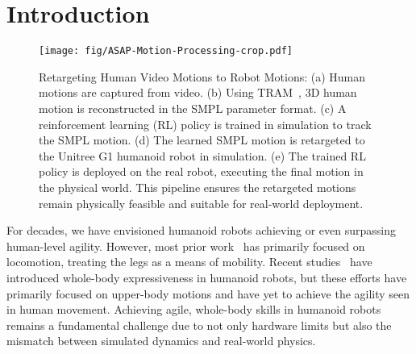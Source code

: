 

\section{Introduction}
\label{sec:introduction}


\begin{figure*}[t]
    \centering
    \texttt{[image: fig/ASAP-Motion-Processing-crop.pdf]}
    \vspace{-3mm}
    \caption{Retargeting Human Video Motions to Robot Motions: (a) Human motions are captured from video. (b) Using TRAM~\cite{wang2025tram}, 3D human motion is reconstructed in the SMPL parameter format. (c) A reinforcement learning (RL) policy is trained in simulation to track the SMPL motion. (d) The learned SMPL motion is retargeted to the Unitree G1 humanoid robot in simulation. (e) The trained RL policy is deployed on the real robot, executing the final motion in the physical world. This pipeline ensures the retargeted motions remain physically feasible and suitable for real-world deployment.}
    \vspace{-3mm}
    \label{fig:data_processing}
\end{figure*}

For decades, we have envisioned humanoid robots achieving or even surpassing human-level agility. However, most prior work~\cite{li2023robust,radosavovic2024real,li2024reinforcement,radosavovic2402humanoid,zhuang2024humanoid,gu2024advancing,Wolf2025AIHumanoid,long2024learning} has primarily focused on locomotion, treating the legs as a means of mobility. Recent studies~\cite{cheng2024expressive,he2024learning,he2024omnih2o,he2024hover,ji2024exbody2} have introduced whole-body expressiveness in humanoid robots, but these efforts have primarily focused on upper-body motions and have yet to achieve the agility seen in human movement. Achieving agile, whole-body skills in humanoid robots remains a fundamental challenge due to not only hardware limits but also the mismatch between simulated dynamics and real-world physics.

